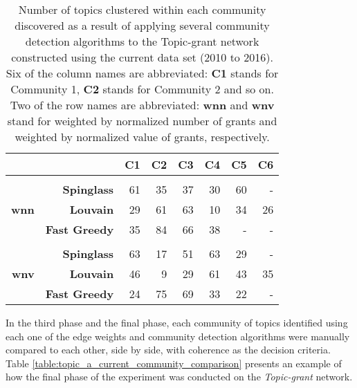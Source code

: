 \begin{table}[!htbp]
\centering
\caption[Number of topics clustered within each community discovered in the Topic-grant network constructed using the current data set (2010 to 2016)]{Number of topics clustered within each community discovered as a result of applying several community detection algorithms to the Topic-grant network constructed using the current data set (2010 to 2016). Six of the column names are abbreviated: \textbf{C1} stands for Community 1, \textbf{C2} stands for Community 2 and so on. Two of the row names are abbreviated: \textbf{wnn} and \textbf{wnv} stand for weighted by normalized number of grants and weighted by normalized value of grants, respectively.}
\label{table:topic_a_current_numbers}
\begin{tabular}{r|rrrrrrr}
\textbf{} & \textbf{} & \textbf{C1} & \textbf{C2} & \textbf{C3} & \textbf{C4} & \textbf{C5} & \textbf{C6}\\
\hline\\
\multirow{3}{*}{\textbf{wnn}}
& \textbf{Spinglass}   & {61} & {35} & {37} & {30} & {60} & {-}\\
& \textbf{Louvain}     & {29} & {61} & {63} & {10} & {34} & {26}\\
& \textbf{Fast Greedy} & {35} & {84} & {66} & {38} & {-}  & {-}\\
\hline\\
\multirow{3}{*}{\textbf{wnv}}
& \textbf{Spinglass}   & {63} & {17} & {51} & {63} & {29} & {-}\\
& \textbf{Louvain}     & {46} & {9}  & {29} & {61} & {43} & {35}\\
& \textbf{Fast Greedy} & {24} & {75} & {69} & {33} & {22} & {-}
\end{tabular}
\end{table}

\clearpage

In the third phase and the final phase, each community of topics identified using each one of the edge weights and community detection algorithms were manually compared to each other, side by side, with coherence as the decision criteria. Table \ref{table:topic_a_current_community_comparison} presents an example of how the final phase of the experiment was conducted on the \textit{Topic-grant} network.

